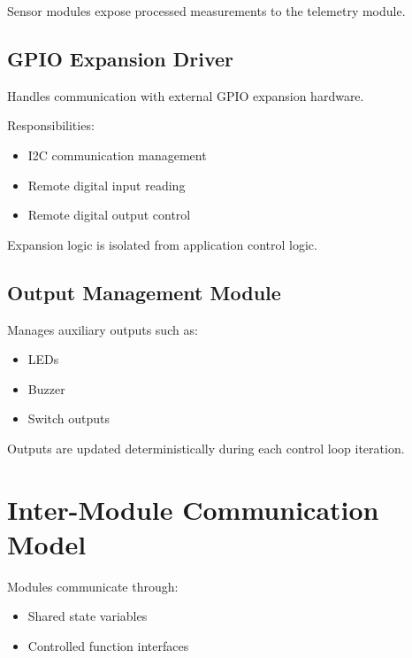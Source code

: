 Sensor modules expose processed measurements to the telemetry module.


\subsection{GPIO Expansion Driver}

Handles communication with external GPIO expansion hardware.

Responsibilities:

\begin{itemize}
	\item I2C communication management
	\item Remote digital input reading
	\item Remote digital output control
\end{itemize}

Expansion logic is isolated from application control logic.


\subsection{Output Management Module}

Manages auxiliary outputs such as:

\begin{itemize}
	\item LEDs
	\item Buzzer
	\item Switch outputs
\end{itemize}

Outputs are updated deterministically during each control loop iteration.


\section{Inter-Module Communication Model}

Modules communicate through:

\begin{itemize}
	\item Shared state variables
	\item Controlled function interfaces
\end{itemize}

